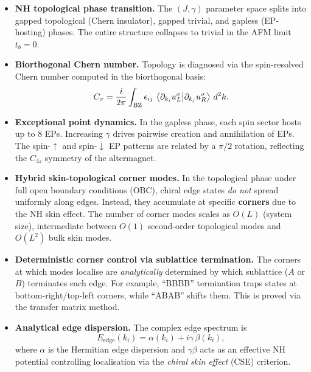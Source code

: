 \documentclass[11pt,a4paper]{article}
\begin{document}
\begin{itemize}
  \item \textbf{NH topological phase transition.}
    The $(J,\gamma)$ parameter space splits into gapped topological (Chern insulator), gapped trivial, and gapless (EP-hosting) phases.  The entire structure collapses to trivial in the AFM limit $t_b=0$.

  \item \textbf{Biorthogonal Chern number.}
    Topology is diagnosed via the spin-resolved Chern number computed in the biorthogonal basis:
    \[
      C_\sigma = \frac{i}{2\pi}\int_{\text{BZ}} \epsilon_{ij}\,
      \braket{\partial_{k_i} u_L^\sigma}{\partial_{k_j} u_R^\sigma}\,d^2k.
    \]

  \item \textbf{Exceptional point dynamics.}
    In the gapless phase, each spin sector hosts up to 8 EPs.  Increasing $\gamma$ drives pairwise creation and annihilation of EPs.  The spin-$\uparrow$ and spin-$\downarrow$ EP patterns are related by a $\pi/2$ rotation, reflecting the $C_{4z}$ symmetry of the altermagnet.

  \item \textbf{Hybrid skin-topological corner modes.}
    In the topological phase under full open boundary conditions (OBC), chiral edge states \emph{do not} spread uniformly along edges.  Instead, they accumulate at specific \textbf{corners} due to the NH skin effect.  The number of corner modes scales as $O(L)$ (system size), intermediate between $O(1)$ second-order topological modes and $O(L^2)$ bulk skin modes.

  \item \textbf{Deterministic corner control via sublattice termination.}
    The corners at which modes localise are \emph{analytically} determined by which sublattice ($A$ or $B$) terminates each edge.  For example, ``BBBB'' termination traps states at bottom-right/top-left corners, while ``ABAB'' shifts them.  This is proved via the transfer matrix method.

  \item \textbf{Analytical edge dispersion.}
    The complex edge spectrum is
    \[
      E_{\text{edge}}(k_i) = \alpha(k_i) + i\gamma\,\beta(k_i),
    \]
    where $\alpha$ is the Hermitian edge dispersion and $\gamma\beta$ acts as an effective NH potential controlling localisation via the \emph{chiral skin effect} (CSE) criterion.
\end{itemize}

\end{document}
